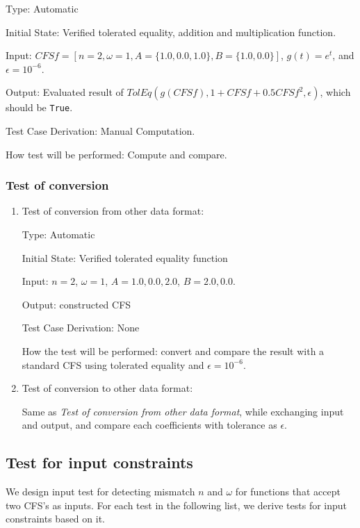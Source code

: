 \documentclass[12pt, titlepage]{article}
\newcommand{\li}[1]{\texttt{#1}}
\begin{document}
\begin{enumerate}
	Type: Automatic
	
	Initial State: Verified tolerated equality, addition and multiplication function.
	
	Input: $\mathit{CFSf}=[n=2, \omega=1, A=\{1.0, 0.0, 1.0\}, B=\{1.0, 0.0\}]$, $g(t)=e^t$, and $\epsilon=10^{-6}$.
	
	Output: Evaluated result of $\mathit{TolEq}(g(\mathit{CFSf}), 1+\mathit{CFSf}+0.5\mathit{CFSf}^2, \epsilon)$, which should be \li{True}.
	
	Test Case Derivation: Manual Computation.
	
	How test will be performed: Compute and compare.
	
\end{enumerate}

\subsubsection{Test of conversion}

\begin{enumerate}
	\item{Test of conversion from other data format:\\}
	
	Type: Automatic
	
	Initial State: Verified tolerated equality function
	
	Input: $n=2$, $\omega=1$, $A={1.0, 0.0, 2.0}$, $B={2.0, 0.0}$.
	
	Output: constructed CFS
	
	Test Case Derivation: None
	
	How the test will be performed: convert and compare the result with a standard CFS using tolerated equality and $\epsilon=10^{-6}$.
	
	\item{Test of conversion to other data format:\\}
	
	Same as \textit{Test of conversion from other data format}, while exchanging input and output, and compare each coefficients with tolerance as $\epsilon$.
	
\end{enumerate}
\subsection{Test for input constraints}
We design input test for detecting mismatch $n$ and $\omega$ for functions that accept two CFS's as inputs. For each test in the following list, we derive tests for input constraints based on it.
\end{document}
